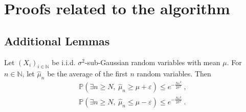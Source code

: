 

\section{Proofs related to the algorithm}\label{app:ub} 

\subsection{Additional Lemmas}

\begin{lemma}\label{lem:subG_concentration}
Let $(X_i)_{i \in \mathbb{N}}$ be i.i.d. $\sigma^2$-sub-Gaussian random variables with mean $\mu$. For $n \in \mathbb{N}$, let $\hat{\mu}_n$ be the average of the first $n$ random variables. Then
\begin{align*}
\mathbb{P}(\exists n \ge N, \ \hat{\mu}_n \ge \mu + \varepsilon) \le e^{- \frac{N \varepsilon^2}{2\sigma^2}}
\: , \\
\mathbb{P}(\exists n \ge N, \ \hat{\mu}_n \le \mu - \varepsilon) \le e^{- \frac{N \varepsilon^2}{2\sigma^2}} \: .
\end{align*}
\end{lemma}


